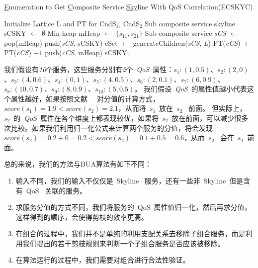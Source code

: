 \begin{algorithm}[!thb]
\caption{\underline{E}numeration to Get \underline{C}omposite Service \underline{Sky}line With QoS Correlation(ECSKYC)}
\label{A:Algo_4_ECSKYC}
    Initialize Lattice L and PT for CndS$_{1}$, CndS$_{2}$\;
    Sub composite service skyline sCSKY $\leftarrow$ $\emptyset$\;
    Min-heap mHeap $\leftarrow$ $\{s_{11},s_{21}\}$\;
    {
        Sub composite service \emph{sCS} $\leftarrow$ pop(mHeap)\;
        {
            {
                push(\emph{sCS}, sCSKY)\;
                cSet $\leftarrow$ generateChildren(\emph{sCS}, \emph{L})\;
                {
                    PT(\emph{cCS}) $\leftarrow$ PT(\emph{cCS}) $- 1$\;
                    {
                        push(\emph{cCS}, mHeap)\;
                    }
                }
            }
        }
    }
    {
    \Return  sCSKY;
    }
\end{algorithm}

\begin{example}
我们假设有\emph{10}个服务，这些服务分别有\emph{2}个~\emph{QoS}~属性：$s_{1}:(1,0.5)$、$s_{2}:(2,0)$、$s_{3}:(4,0.6)$、$s_{4}:(0,1)$、$s_{5}:(4,0.5)$、$s_{6}:(2,0.1)$、$s_{7}:(6,0.9)$、$s_{8}:(10,0.7)$、$s_{9}:(8,0.9)$、$s_{10}:(5,0.5)$。
我们假设~\emph{QoS}~的属性值越小代表这个属性越好，如果按照文献~\emph{\cite{yu2013efficient}}~ 对分值的计算方式，$score(s_{1})=1.9 < score(s_{2})=2.1$，从而将~$s_{1}$~放在~$s_{2}$~ 前面。
但实际上，~$s_{2}$~的~\emph{QoS}~属性在各个维度上都表现较优，如果将~$s_{2}$~放在前面，可以减少很多次比较。如果我们利用归一化公式来计算两个服务的分值，将会发现$score(s_{2})=0.2+0=0.2 < score(s_{2})=0.1+0.5=0.6$，从而~$s_{2}$~ 会在~$s_{1}$~前面。
\end{example}

总的来说，我们的方法与BUA算法有如下不同：
\begin{enumerate}
  \item 输入不同，我们的输入不仅仅是~Skyline~ 服务，还有一些非~Skyline~但是含有~QoS~ 关联的服务。
  \item 求服务分值的方式不同，我们将服务的~QoS~属性值归一化，然后再求分值，这样得到的顺序，会使得剪枝的效率更高。
  \item 在组合的过程中，我们并不是单纯的利用支配关系去移除子组合服务，而是利用我们提出的若干剪枝规则来判断一个子组合服务是否应该被移除。
  \item 在算法运行的过程中，我们需要对组合进行合法性验证。
\end{enumerate}

